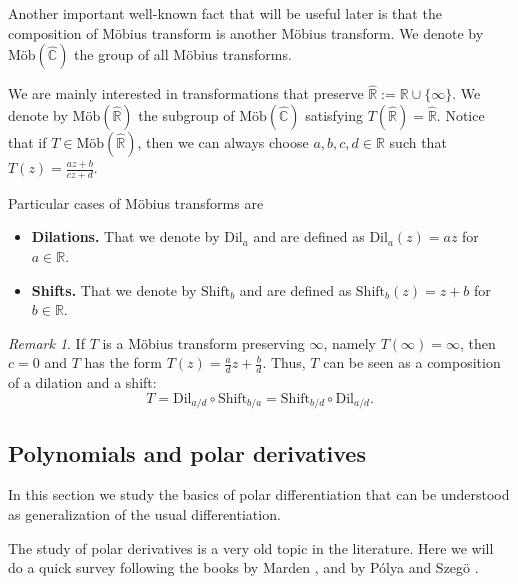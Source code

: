 \documentclass[reqno,11pt]{amsart}
\theoremstyle{remark}
\newtheorem{remark}[theorem]{Remark}
\newcommand{\cc}{\mathbb{C}}
\newcommand{\rr}{\mathbb{R}}
\newcommand{\dil}[1]{\mbox{Dil}_{#1}}
\newcommand{\shift}[1]{\mbox{Shift}_{#1}}
\newcommand{\mobr}{\text{Möb}(\hat{\rr})}
\newcommand{\mobc}{\text{Möb}(\hat{\cc})}
\begin{document}
Another important well-known fact that will be useful later is that the composition of Möbius transform is another Möbius transform. We denote by $\mobc$ the group of all Möbius transforms.

We are mainly interested in transformations that preserve $\hat{\rr}:=\rr\cup\{\infty\}$. We denote by $\mobr$ the subgroup of $\mobc$ satisfying $T(\hat{\rr})=\hat{\rr}$. Notice that if $T\in\mobr$, then we can always choose $a,b,c,d\in \rr$ such that $ T(z) = \frac{az+b}{cz+d}$.

Particular cases of Möbius transforms are
\begin{itemize}
    \item \textbf{Dilations.} That we denote by $\dil{a}$ and are defined as $\dil{a}(z)=az$ for $a\in\rr$.
    \item \textbf{Shifts.} That we denote by $\shift{b}$ and are defined as $\shift{b}(z)=z+b$ for $b\in\rr$.
\end{itemize} 


\begin{remark}
\label{rem:Mobius.fix.infty}
If $T$ is a Möbius transform preserving $\infty$, namely $T(\infty)=\infty$, then $c=0$ and $T$ has the form $ T(z) = \frac{a}{d}z+\frac{b}{d} $. Thus, $T$ can be seen as a composition of a dilation and a shift:
$$T= \dil{a/d}\circ\shift{b/a} = \shift{b/d}\circ \dil{a/d}.$$
\end{remark}



\subsection{Polynomials and polar derivatives}



In this section we study the basics of polar differentiation that can be understood as generalization of the usual differentiation. 

The study of polar derivatives is a very old topic in the literature. Here we will do a quick survey following the books by Marden \cite{marden1949geometry}, and by P{\'o}lya and Szeg{\"o} \cite{polya2012problems}.
\end{document}
